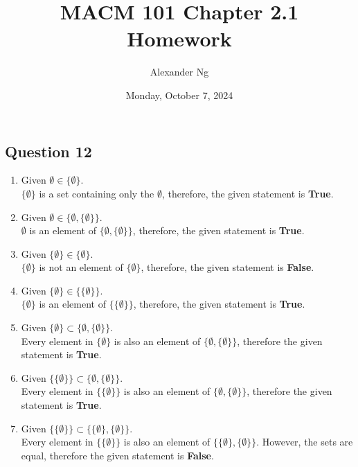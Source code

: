 \documentclass[12pt]{article}
\begin{document}
\title{MACM 101 Chapter 2.1 Homework}
\author{Alexander Ng}
\date{Monday, October 7, 2024}

\maketitle

\subsection*{Question 12}

\begin{enumerate}[label=(\alph*)]
  \item Given $\emptyset \in \{ \emptyset \}$.\\
    $\{ \emptyset \}$ is a set containing only the $\emptyset$, therefore,
    the given statement is \textbf{True}.
  \item Given $\emptyset \in \{\emptyset , \{ \emptyset \}\}$.\\
    $\emptyset$ is an element of $\{\emptyset , \{ \emptyset \}\}$, therefore,
    the given statement is \textbf{True}.
  \item Given $\{ \emptyset \} \in \{\emptyset \}$.\\
    $\{ \emptyset \}$ is not an element of $\{\emptyset \}$, therefore, the given
    statement is \textbf{False}.
  \item Given $\{ \emptyset \} \in \{ \{ \emptyset \}\}$.\\
    $\{ \emptyset \}$ is an element of $\{ \{ \emptyset \}\}$, therefore,
    the given statement is \textbf{True}.
  \item Given $\{\emptyset\} \subset \{\emptyset,\{ \emptyset \}\}$.\\
    Every element in $\{\emptyset\}$ is also an element of 
    $\{ \emptyset, \{ \emptyset \} \}$, therefore the given statement is \textbf{True}.
  \item Given $\{ \{ \emptyset \} \} \subset \{ \emptyset, \{ \emptyset \}\}$.\\
    Every element in $\{ \{ \emptyset \} \}$ is also an element of 
    $\{ \emptyset, \{ \emptyset \} \}$, therefore the given statement is \textbf{True}.
  \item Given $\{ \{ \emptyset \} \} \subset \{ \{ \emptyset \}, \{ \emptyset \} \}$. \\
    Every element in $\{ \{ \emptyset \} \}$ is also an element of
    $\{ \{ \emptyset \}, \{ \emptyset \} \}$. However, the sets are equal,
    therefore the given statement is \textbf{False}.
\end{enumerate}
\end{document}
